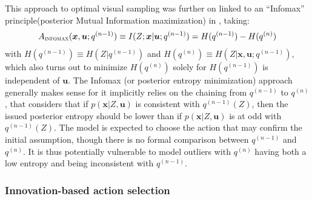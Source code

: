 \documentclass[12pt,twoside,openright]{article}
\begin{document}
This approach to optimal visual sampling was further on linked to an ``Infomax'' principle(posterior Mutual Information maximization) in \citet{butko2010infomax}, 
taking:
\begin{align}A_\text{\sc infomax}(\boldsymbol{x}, \boldsymbol{u}; q^{(n-1)}) \equiv I(Z; \boldsymbol{x}|\boldsymbol{u}; q^{(n-1)})
= H(q^{(n-1)}) - H(q^{(n)})
\label{eq:infomax}
\end{align}
with  $H(q^{(n-1)}) \equiv H(Z|q^{(n-1)})$ and $H(q^{(n)}) \equiv H(Z|\boldsymbol{x}, \boldsymbol{u}; q^{(n-1)})$, which also turns out to minimize $H(q^{(n)})$ solely for $H(q^{(n-1)})$ is independent of $\boldsymbol{u}$.
The Infomax (or posterior entropy minimization) approach generally makes sense for it implicitly relies on the chaining from $q^{(n-1)}$ to $q^{(n)}$, that considers that if $p(\boldsymbol{x}|Z, \boldsymbol{u})$ is consistent with $q^{(n-1)}(Z)$, then the issued posterior entropy should be lower than if $p(\boldsymbol{x}|Z, \boldsymbol{u})$ is at odd with $q^{(n-1)}(Z)$. The model is expected to choose the action that may confirm the initial assumption, though there is no formal comparison between $q^{(n-1)}$ and $q^{(n)}$.
It is thus potentially vulnerable to model outliers with $q^{(n)}$ having both a low entropy and being inconsistent with $q^{(n-1)}$.

\subsubsection{Innovation-based action selection}\label{sec:saliency}
\end{document}
